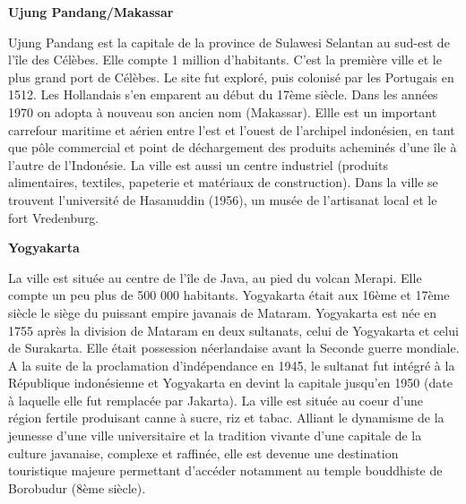 \textbf{Ujung Pandang/Makassar}

Ujung Pandang est la capitale de la province de Sulawesi Selantan au sud-est de l'île des Célèbes. Elle compte 1 million d'habitants. C'est la première ville et le plus grand port de Célèbes. Le site fut exploré, puis colonisé par les Portugais en 1512. Les Hollandais s'en emparent au début du 17ème siècle. Dans les années 1970 on adopta à nouveau son ancien nom (Makassar). Ellle est un important carrefour maritime et aérien entre l'est et l'ouest de l'archipel indonésien, en tant que pôle commercial et point de déchargement des produits acheminés d'une île à l'autre de l'Indonésie. La ville est aussi un centre industriel (produits alimentaires, textiles, papeterie et matériaux de construction). Dans la ville se trouvent l'université de Hasanuddin (1956), un musée de l'artisanat local et le fort Vredenburg.

\textbf{Yogyakarta}

La ville est située au centre de l'île de Java, au pied du volcan Merapi. Elle compte un peu plus de 500 000 habitants. Yogyakarta était aux 16ème et 17ème siècle le siège du puissant empire javanais de Mataram. Yogyakarta est née en 1755 après la division de Mataram en deux sultanats, celui de Yogyakarta et celui de Surakarta. Elle était possession néerlandaise avant la Seconde guerre mondiale. A la suite de la proclamation d'indépendance en 1945, le sultanat fut intégré à la République indonésienne et Yogyakarta en devint la capitale jusqu'en 1950 (date à laquelle elle fut remplacée par Jakarta). La ville est située au coeur d'une région fertile produisant canne à sucre, riz et tabac. Alliant le dynamisme de la jeunesse d'une ville universitaire et la tradition vivante d'une capitale de la culture javanaise, complexe et raffinée, elle est devenue une destination touristique majeure permettant d'accéder notamment au temple bouddhiste de Borobudur (8ème siècle).


\vfill
